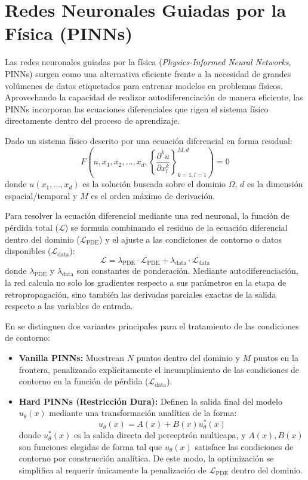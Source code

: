\section{Redes Neuronales Guiadas por la Física (PINNs)}

Las redes neuronales guiadas por la física (\textit{Physics-Informed Neural Networks}, PINNs) surgen como una alternativa eficiente frente a la necesidad de grandes volúmenes de datos etiquetados para entrenar modelos en problemas físicos. Aprovechando la capacidad de realizar autodiferenciación de manera eficiente, las PINNs incorporan las ecuaciones diferenciales que rigen el sistema físico directamente dentro del proceso de aprendizaje.

Dado un sistema físico descrito por una ecuación diferencial en forma residual:
\begin{equation}
    F\left( u, x_1, x_2, \dots, x_d, \left\{ \frac{\partial^k u}{\partial x_l^k} \right\}_{k=1, l=1}^{M, d} \right) = 0
\end{equation}
donde $u(x_1, \dots, x_d)$ es la solución buscada sobre el dominio $\Omega$, $d$ es la dimensión espacial/temporal y $M$ es el orden máximo de derivación.

Para resolver la ecuación diferencial mediante una red neuronal, la función de pérdida total ($\mathcal{L}$) se formula combinando el residuo de la ecuación diferencial dentro del dominio ($\mathcal{L}_{\text{PDE}}$) y el ajuste a las condiciones de contorno o datos disponibles ($\mathcal{L}_{\text{data}}$):
\begin{equation}
    \mathcal{L} = \lambda_{\text{PDE}} \cdot \mathcal{L}_{\text{PDE}} + \lambda_{\text{data}} \cdot \mathcal{L}_{\text{data}}
\end{equation}
donde $\lambda_{\text{PDE}}$ y $\lambda_{\text{data}}$ son constantes de ponderación. Mediante autodiferenciación, la red calcula no solo los gradientes respecto a sus parámetros en la etapa de retropropagación, sino también las derivadas parciales exactas de la salida respecto a las variables de entrada.

En \cite{tesisDiliscia} se distinguen dos variantes principales para el tratamiento de las condiciones de contorno:
\begin{itemize}
    \item \textbf{Vanilla PINNs:} Muestrean $N$ puntos dentro del dominio y $M$ puntos en la frontera, penalizando explícitamente el incumplimiento de las condiciones de contorno en la función de pérdida ($\mathcal{L}_{\text{data}}$).
    \item \textbf{Hard PINNs (Restricción Dura):} Definen la salida final del modelo $u_\theta(x)$ mediante una transformación analítica de la forma:
    \begin{equation}
        u_\theta(x) = A(x) + B(x) u^*_\theta(x)
    \end{equation}
    donde $u^*_\theta(x)$ es la salida directa del perceptrón multicapa, y $A(x), B(x)$ son funciones elegidas de forma tal que $u_\theta(x)$ satisface las condiciones de contorno por construcción analítica. De este modo, la optimización se simplifica al requerir únicamente la penalización de $\mathcal{L}_{\text{PDE}}$ dentro del dominio.
\end{itemize}


